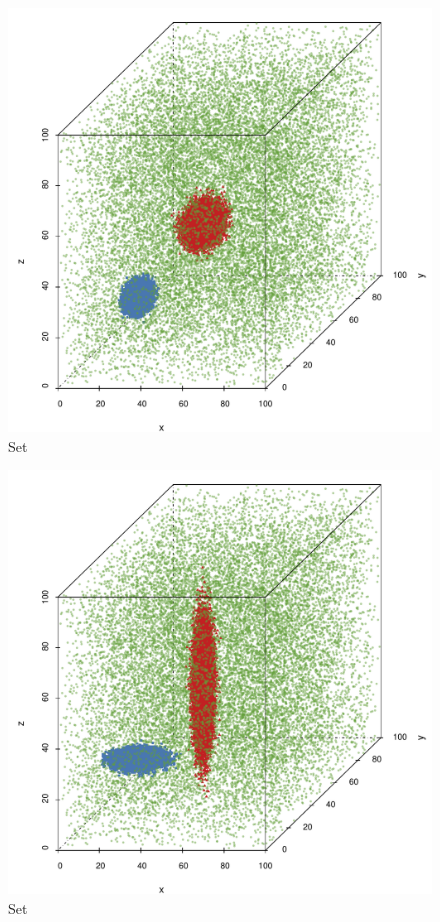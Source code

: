 \begin{subfigure}{0.23\textwidth}
	\centering
	\includegraphics[width=\textwidth]{experiment/img/datasetplot_ferdosi_2_60000}
	\caption{Set \ferdosiTwo}
	\label{fig:3:simulated:datasets:ferdosi2}
\end{subfigure}	
\begin{subfigure}{0.23\textwidth}
	\centering
	\includegraphics[width=\textwidth]{experiment/img/datasetplot_baakman_2_60000}
	\caption{Set \baakmanTwo}
	\label{fig:3:simulated:datasets:baakman2}
\end{subfigure}	
